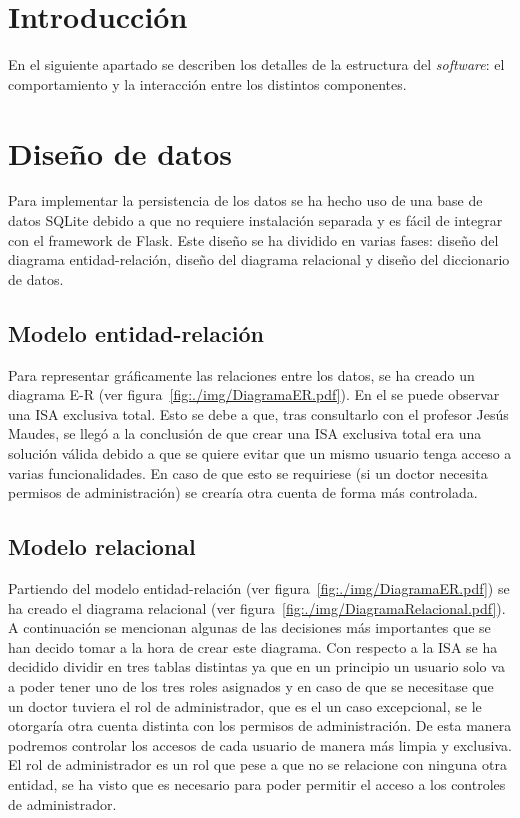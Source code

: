 
\section{Introducción}
En el siguiente apartado se describen los detalles de la estructura del \textit{software}: el comportamiento y la interacción entre los distintos componentes.

\section{Diseño de datos}
Para implementar la persistencia de los datos se ha hecho uso de una base de datos SQLite debido a que no requiere instalación separada y es fácil de integrar con el framework de Flask. Este diseño se ha dividido en varias fases: diseño del diagrama entidad-relación, diseño del diagrama relacional y diseño del diccionario de datos.

\subsection{Modelo entidad-relación}

Para representar gráficamente las relaciones entre los datos, se ha creado un diagrama E-R (ver figura~\ref{fig:./img/DiagramaER.pdf}). En el se puede observar una ISA exclusiva total. Esto se debe a que, tras consultarlo con el profesor Jesús Maudes, se llegó a la conclusión de que crear una ISA exclusiva total era una solución válida debido a que se quiere evitar que un mismo usuario tenga acceso a varias funcionalidades. En caso de que esto se requiriese (si un doctor necesita permisos de administración) se crearía otra cuenta de forma más controlada.
\begin{landscape}
\end{landscape}
\subsection{Modelo relacional}

Partiendo del modelo entidad-relación (ver figura~\ref{fig:./img/DiagramaER.pdf}) se ha creado el diagrama relacional (ver figura~\ref{fig:./img/DiagramaRelacional.pdf}).
A continuación se mencionan algunas de las decisiones más importantes que se han decido tomar a la hora de crear este diagrama.
Con respecto a la ISA se ha decidido dividir en tres tablas distintas ya que en un principio un usuario solo va a poder tener uno de los tres roles asignados y en caso de que se necesitase que un doctor tuviera el rol de administrador, que es el un caso excepcional, se le otorgaría otra cuenta distinta con los permisos de administración. De esta manera podremos controlar los accesos de cada usuario de manera más limpia y exclusiva.
El rol de administrador es un rol que pese a que no se relacione con ninguna otra entidad, se ha visto que es necesario para poder permitir el acceso a los controles de administrador.


